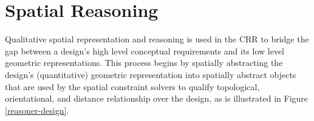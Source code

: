 \documentclass[12pt]{ucthesis}
\begin{document}




\section{Spatial Reasoning}
Qualitative spatial representation and reasoning is used in the CRR to bridge the gap between a design's high level conceptual requirements and its low level geometric representations. This process begins by spatially abstracting the design's (quantitative) geometric representation into spatially abstract objects that are used by the spatial constraint solvers to qualify topological, orientational, and distance relationship over the design, as is illustrated in Figure \ref{reasoner-design}. 
\end{document}
